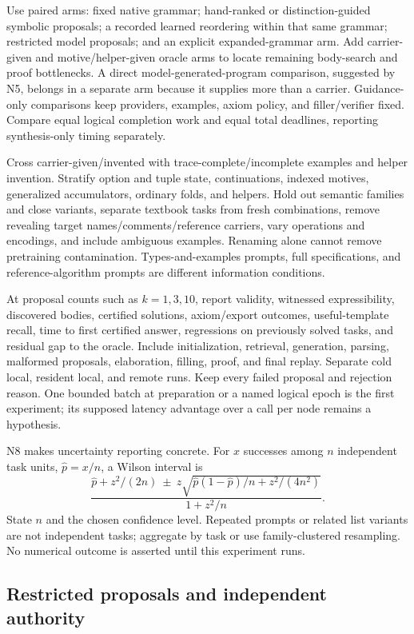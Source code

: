 Use paired arms: fixed native grammar; hand-ranked or distinction-guided symbolic proposals; a recorded learned reordering within that same grammar; restricted model proposals; and an explicit expanded-grammar arm. Add carrier-given and motive/helper-given oracle arms to locate remaining body-search and proof bottlenecks. A direct model-generated-program comparison, suggested by N5, belongs in a separate arm because it supplies more than a carrier. Guidance-only comparisons keep providers, examples, axiom policy, and filler/verifier fixed. Compare equal logical completion work and equal total deadlines, reporting synthesis-only timing separately.

Cross carrier-given/invented with trace-complete/incomplete examples and helper invention. Stratify option and tuple state, continuations, indexed motives, generalized accumulators, ordinary folds, and helpers. Hold out semantic families and close variants, separate textbook tasks from fresh combinations, remove revealing target names/comments/reference carriers, vary operations and encodings, and include ambiguous examples. Renaming alone cannot remove pretraining contamination. Types-and-examples prompts, full specifications, and reference-algorithm prompts are different information conditions.

At proposal counts such as $k=1,3,10$, report validity, witnessed expressibility, discovered bodies, certified solutions, axiom/export outcomes, useful-template recall, time to first certified answer, regressions on previously solved tasks, and residual gap to the oracle. Include initialization, retrieval, generation, parsing, malformed proposals, elaboration, filling, proof, and final replay. Separate cold local, resident local, and remote runs. Keep every failed proposal and rejection reason. One bounded batch at preparation or a named logical epoch is the first experiment; its supposed latency advantage over a call per node remains a hypothesis.

N8 makes uncertainty reporting concrete. For $x$ successes among $n$ independent task units, $\hat p=x/n$, a Wilson interval is
\[
 \frac{\hat p+z^2/(2n)\ \pm\
 z\sqrt{\hat p(1-\hat p)/n+z^2/(4n^2)}}{1+z^2/n}.
\]
State $n$ and the chosen confidence level. Repeated prompts or related list variants are not independent tasks; aggregate by task or use family-clustered resampling. No numerical outcome is asserted until this experiment runs.

\subsection{Restricted proposals and independent authority}\label{sec:learning-interface}

